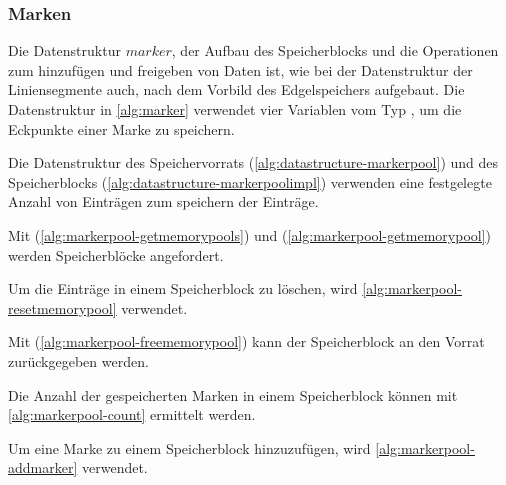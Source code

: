 \subsubsection{Marken} %
\label{sub:marken}

Die Datenstruktur $\mathit{marker}$, der Aufbau des Speicherblocks und die Operationen zum hinzufügen und freigeben von
 Daten ist, wie bei der Datenstruktur der Liniensegmente auch, nach dem Vorbild des Edgelspeichers aufgebaut. Die
 Datenstruktur in \autoref{alg:marker} verwendet vier Variablen vom Typ , um die Eckpunkte einer Marke
 zu speichern.



Die Datenstruktur des Speichervorrats (\autoref{alg:datastructure-markerpool}) und des Speicherblocks
 (\autoref{alg:datastructure-markerpoolimpl}) verwenden eine festgelegte Anzahl von Einträgen zum speichern der
 Einträge.



Mit  (\autoref{alg:markerpool-getmemorypools}) und 
 (\autoref{alg:markerpool-getmemorypool}) werden Speicherblöcke angefordert.




Um die Einträge in einem Speicherblock zu löschen, wird \autoref{alg:markerpool-resetmemorypool} verwendet.



Mit  (\autoref{alg:markerpool-freememorypool}) kann der Speicherblock an den Vorrat
 zurückgegeben werden.



Die Anzahl der gespeicherten Marken in einem Speicherblock können mit \autoref{alg:markerpool-count} ermittelt werden.



Um eine Marke zu einem Speicherblock hinzuzufügen, wird \autoref{alg:markerpool-addmarker} verwendet.



